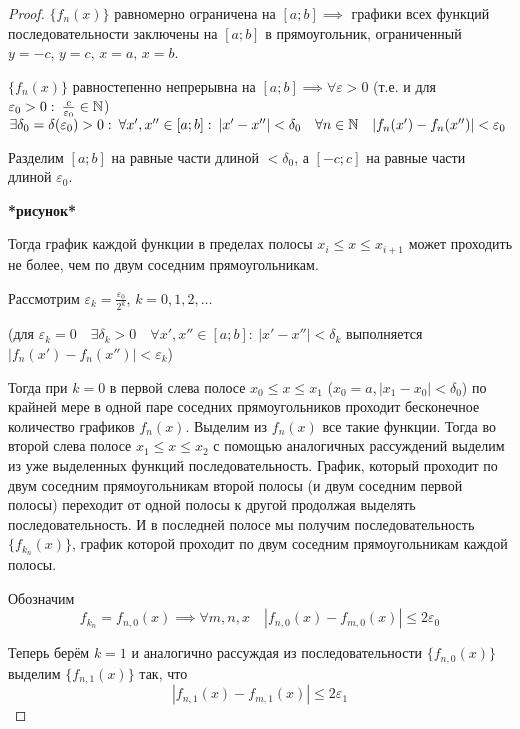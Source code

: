 \begin{proof}
    $\{ f_n(x) \}$ равномерно ограничена на $[a; b] \implies$ графики всех
    функций последовательности заключены на $[a; b]$ в прямоугольник, 
    ограниченный $y = -c, \, y = c, \, x = a, \, x = b$.
    
    $\{ f_n(x) \}$ равностепенно непрерывна на $[a; b] \implies 
    \forall \varepsilon > 0$ (т.е. и для $\varepsilon_0 > 0: \: \frac{c}{\varepsilon_0} \in \mathbb{N}$)
    $\exists \delta_0 = \delta (\varepsilon_0) > 0: \: \forall x', x'' \in [a; b]: \:
    |x' - x''| < \delta_0 \quad \forall n \in \mathbb{N} \quad |f_n(x') - f_n(x'')| < \varepsilon_0$

    Разделим $[a; b]$ на равные части длиной $< \delta_0$, а $[-c; c]$ на
    равные части длиной $\varepsilon_0$.

    \textbf{*рисунок*}

    Тогда график каждой функции в пределах полосы $x_i \leq x \leq x_{i + 1}$
    может проходить не более, чем по двум соседним прямоугольникам.

    Рассмотрим $\varepsilon_k = \frac{\varepsilon_0}{2^k}, \, k = 0,1,2,\dots$

    (для $\varepsilon_k = 0 \quad \exists \delta_k > 0 \quad 
    \forall x', x'' \in [a; b]: \: |x' - x''| < \delta_k$ выполняется
    $|f_n(x') - f_n(x'')| < \varepsilon_k$)

    Тогда при $k = 0$ в первой слева полосе $x_0 \leq x \leq x_1$ 
    ($x_0 = a, |x_1 - x_0| < \delta_0$) по крайней мере в одной паре соседних
    прямоугольников проходит бесконечное количество графиков $f_n(x)$.
    Выделим из $f_n(x)$ все такие функции. Тогда во второй слева полосе
    $x_1 \leq x \leq x_2$ с помощью аналогичных рассуждений выделим из уже
    выделенных функций последовательность. График, который проходит по двум
    соседним прямоугольникам второй полосы (и двум соседним первой полосы)
    переходит от одной полосы к другой продолжая выделять последовательность.
    И в последней полосе мы получим последовательность $\{ f_{k_n} (x) \}$,
    график которой проходит по двум соседним прямоугольникам каждой полосы.

    Обозначим
    \[ 
        f_{k_n} = f_{n,0}(x) \implies 
        \forall m,n,x \quad |f_{n,0}(x) - f_{m,0}(x)| \leq 2\varepsilon_0 
    \]

    Теперь берём $k = 1$ и аналогично рассуждая из последовательности
    $\{ f_{n, 0}(x) \}$ выделим $\{ f_{n,1}(x) \}$ так, что
    \[ |f_{n,1}(x) - f_{m,1}(x)| \leq 2 \varepsilon_1 \]


\end{proof}
